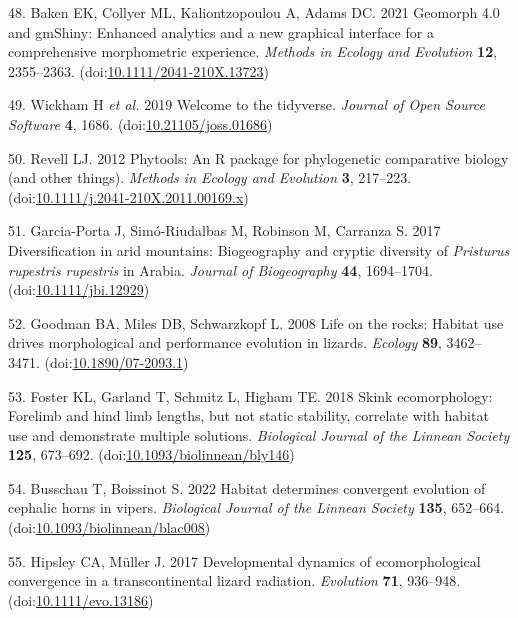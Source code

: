 \documentclass[
  11pt,
]{article}
\begin{document}
\leavevmode\hypertarget{ref-Baken2021}{}%
48. Baken EK, Collyer ML, Kaliontzopoulou A, Adams DC. 2021 Geomorph 4.0
and gmShiny: Enhanced analytics and a new graphical interface for a
comprehensive morphometric experience. \emph{Methods in Ecology and
Evolution} \textbf{12}, 2355--2363.
(doi:\href{https://doi.org/10.1111/2041-210X.13723}{10.1111/2041-210X.13723})

\leavevmode\hypertarget{ref-Wickham2019}{}%
49. Wickham H \emph{et al.} 2019 Welcome to the tidyverse. \emph{Journal
of Open Source Software} \textbf{4}, 1686.
(doi:\href{https://doi.org/10.21105/joss.01686}{10.21105/joss.01686})

\leavevmode\hypertarget{ref-Revell2012}{}%
50. Revell LJ. 2012 Phytools: An R package for phylogenetic comparative
biology (and other things). \emph{Methods in Ecology and Evolution}
\textbf{3}, 217--223.
(doi:\href{https://doi.org/10.1111/j.2041-210X.2011.00169.x}{10.1111/j.2041-210X.2011.00169.x})

\leavevmode\hypertarget{ref-Garcia-Porta2017}{}%
51. Garcia-Porta J, Simó-Riudalbas M, Robinson M, Carranza S. 2017
Diversification in arid mountains: Biogeography and cryptic diversity of
\emph{Pristurus rupestris rupestris} in Arabia. \emph{Journal of
Biogeography} \textbf{44}, 1694--1704.
(doi:\href{https://doi.org/10.1111/jbi.12929}{10.1111/jbi.12929})

\leavevmode\hypertarget{ref-Goodman2008}{}%
52. Goodman BA, Miles DB, Schwarzkopf L. 2008 Life on the rocks: Habitat
use drives morphological and performance evolution in lizards.
\emph{Ecology} \textbf{89}, 3462--3471.
(doi:\href{https://doi.org/10.1890/07-2093.1}{10.1890/07-2093.1})

\leavevmode\hypertarget{ref-Foster2018}{}%
53. Foster KL, Garland T, Schmitz L, Higham TE. 2018 Skink
ecomorphology: Forelimb and hind limb lengths, but not static stability,
correlate with habitat use and demonstrate multiple solutions.
\emph{Biological Journal of the Linnean Society} \textbf{125}, 673--692.
(doi:\href{https://doi.org/10.1093/biolinnean/bly146}{10.1093/biolinnean/bly146})

\leavevmode\hypertarget{ref-Busschau2022}{}%
54. Busschau T, Boissinot S. 2022 Habitat determines convergent
evolution of cephalic horns in vipers. \emph{Biological Journal of the
Linnean Society} \textbf{135}, 652--664.
(doi:\href{https://doi.org/10.1093/biolinnean/blac008}{10.1093/biolinnean/blac008})

\leavevmode\hypertarget{ref-HipsleyMuller2017}{}%
55. Hipsley CA, Müller J. 2017 Developmental dynamics of
ecomorphological convergence in a transcontinental lizard radiation.
\emph{Evolution} \textbf{71}, 936--948.
(doi:\href{https://doi.org/10.1111/evo.13186}{10.1111/evo.13186})
\end{document}

